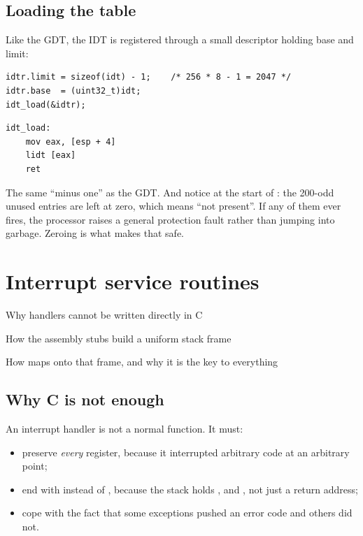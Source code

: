 \section{Loading the table}

Like the GDT, the IDT is registered through a small descriptor holding base and limit:

\begin{lstlisting}[style=c]
idtr.limit = sizeof(idt) - 1;    /* 256 * 8 - 1 = 2047 */
idtr.base  = (uint32_t)idt;
idt_load(&idtr);
\end{lstlisting}

\begin{lstlisting}[style=asm]
idt_load:
    mov eax, [esp + 4]
    lidt [eax]
    ret
\end{lstlisting}

The same ``minus one'' as the GDT. And notice  at the start of
: the 200-odd unused entries are left at zero, which means ``not present''. If any
of them ever fires, the processor raises a general protection fault rather than jumping into
garbage. Zeroing is what makes that safe.

\chapter{Interrupt service routines}

\begin{goals}
  \item Why handlers cannot be written directly in C
  \item How the assembly stubs build a uniform stack frame
  \item How  maps onto that frame, and why it is the key to everything
\end{goals}

\section{Why C is not enough}

An interrupt handler is not a normal function. It must:

\begin{itemize}
  \item preserve \emph{every} register, because it interrupted arbitrary code at an arbitrary
        point;
  \item end with  instead of , because the stack holds ,  and
        , not just a return address;
  \item cope with the fact that some exceptions pushed an error code and others did not.
\end{itemize}

